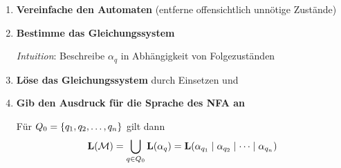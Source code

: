 \documentclass{beamer}
\begin{document}
	\begin{frame}		
		\small
		\begin{enumerate}[(1)]
			\item \textbf{Vereinfache den Automaten} (entferne offensichtlich unnötige Zustände)	
			
			\item \textbf{Bestimme das Gleichungssystem} 
			
			\textit{Intuition}: Beschreibe $\alpha_q$ in Abhängigkeit von Folgezuständen
			
			\item \textbf{Löse das Gleichungssystem} durch Einsetzen und
			
			\item \textbf{Gib den Ausdruck für die Sprache des NFA an}
			
			Für $Q_0 = \left\{ q_1,q_2,\dots, q_n \right\}$ gilt dann
			\begin{equation*}
				\textbf{\textcolor{black}{L}}(\mathcal{M})
				=\bigcup_{q\in Q_0} \textbf{\textcolor{black}{L}}(\alpha_q)
				=  \textbf{\textcolor{black}{L}}(\alpha_{q_1}\mid\alpha_{q_2}\mid\dots\mid \alpha_{q_n})
			\end{equation*}
		\end{enumerate}
	\end{frame}

	\newcommand{\Lijk}[3]{\ensuremath{\Slang{L}^{#3}[#1,#2]}}
	\newcommand{\alphaijk}[3]{\ensuremath{\alpha^{#3}[#1,#2]}}
	
\end{document}
